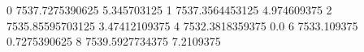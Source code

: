 0 7537.7275390625 5.345703125
1 7537.3564453125 4.974609375
2 7535.85595703125 3.47412109375
4 7532.3818359375 0.0
6 7533.109375 0.7275390625
8 7539.5927734375 7.2109375
